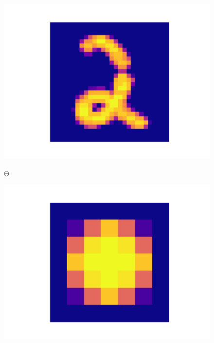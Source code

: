 \vspace{-2mm}
\begin{figure}[h]
  \begin{center}

\begin{minipage}{0.49\linewidth}
    \begin{minipage}{0.3\linewidth}
        \centering
        \includegraphics[width=1.0\textwidth]{figures/original.pdf}
    \end{minipage}%
    \begin{minipage}{0.04\linewidth}
        \centering
        \large $\ominus$
    \end{minipage}%
    \begin{minipage}{0.2\linewidth}
        \centering
        \includegraphics[width=0.7\linewidth]{figures/selem.pdf}
    \end{minipage}%
    \begin{minipage}{0.06\linewidth}
        \centering

\end{minipage}
\end{minipage}
\end{center}
\end{figure}
